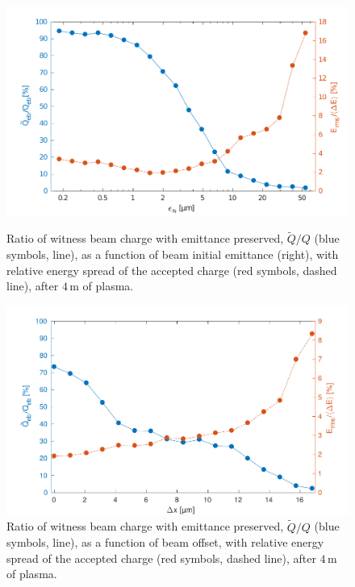 \documentclass[aps,prstab,reprint,amsmath,amssymb,groupedaddress]{revtex4-1}
\newcommand{\unit}[1]{\,\mathrm{#1}}
\begin{document}
\begin{figure}[hbt]
    \begin{minipage}[t]{.48\textwidth}
        \includegraphics[width=\linewidth,trim={2mm 0mm 2mm 0mm},clip]{figures/beamQualityEmittance}
        \caption{\label{Fig:BeamQEmit} Ratio of witness beam charge with emittance preserved, $\widetilde{Q}/Q$ (blue
            symbols, line), as a function of beam initial emittance (right), with relative energy spread of the accepted
            charge (red symbols, dashed line), after $4\unit{m}$ of plasma.}
    \end{minipage}\hfill
    \begin{minipage}[t]{.48\textwidth}
        \includegraphics[width=\linewidth,trim={2mm 0mm 2mm 0mm},clip]{figures/beamQualityOffset}
        \caption{\label{Fig:BeamQOffset} Ratio of witness beam charge with emittance preserved, $\widetilde{Q}/Q$ (blue
            symbols, line), as a function of beam offset, with relative energy spread of the accepted charge (red
            symbols, dashed line), after $4\unit{m}$ of plasma.}
    \end{minipage}
\end{figure}
\end{document}

